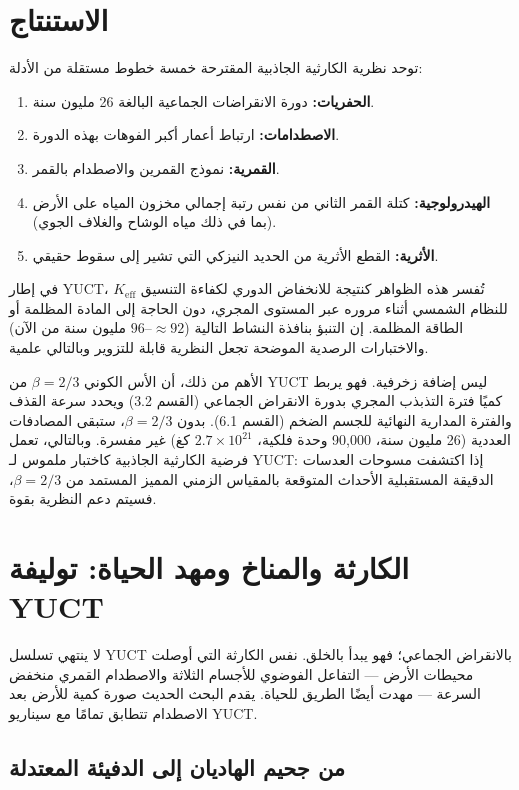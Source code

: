 \documentclass[11pt,a4paper]{article}
\begin{document}
	\section{الاستنتاج}
	
	توحد نظرية الكارثية الجاذبية المقترحة خمسة خطوط مستقلة من الأدلة:
	\begin{enumerate}
		\item \textbf{الحفريات:} دورة الانقراضات الجماعية البالغة 26 مليون سنة.
		\item \textbf{الاصطدامات:} ارتباط أعمار أكبر الفوهات بهذه الدورة.
		\item \textbf{القمرية:} نموذج القمرين والاصطدام بالقمر.
		\item \textbf{الهيدرولوجية:} كتلة القمر الثاني من نفس رتبة إجمالي مخزون المياه على الأرض (بما في ذلك مياه الوشاح والغلاف الجوي).
		\item \textbf{الأثرية:} القطع الأثرية من الحديد النيزكي التي تشير إلى سقوط حقيقي.
	\end{enumerate}
	في إطار YUCT، تُفسر هذه الظواهر كنتيجة للانخفاض الدوري لكفاءة التنسيق \(K_{\mathrm{eff}}\) للنظام الشمسي أثناء مروره عبر المستوى المجري، دون الحاجة إلى المادة المظلمة أو الطاقة المظلمة. إن التنبؤ بنافذة النشاط التالية (\(\approx 92\)–\(96\) مليون سنة من الآن) والاختبارات الرصدية الموضحة تجعل النظرية قابلة للتزوير وبالتالي علمية.
	
	الأهم من ذلك، أن الأس الكوني $\beta = 2/3$ من YUCT ليس إضافة زخرفية. فهو يربط كميًا فترة التذبذب المجري بدورة الانقراض الجماعي (القسم 3.2) ويحدد سرعة القذف والفترة المدارية النهائية للجسم الضخم (القسم 6.1). بدون $\beta = 2/3$، ستبقى المصادفات العددية (26 مليون سنة، 90,000 وحدة فلكية، \(2.7\times10^{21}\) كغ) غير مفسرة. وبالتالي، تعمل فرضية الكارثية الجاذبية كاختبار ملموس لـ YUCT: إذا اكتشفت مسوحات العدسات الدقيقة المستقبلية الأحداث المتوقعة بالمقياس الزمني المميز المستمد من $\beta = 2/3$، فسيتم دعم النظرية بقوة.
	
	\section{الكارثة والمناخ ومهد الحياة: توليفة YUCT}
	
	لا ينتهي تسلسل YUCT بالانقراض الجماعي؛ فهو يبدأ بالخلق. 
	نفس الكارثة التي أوصلت محيطات الأرض — التفاعل الفوضوي للأجسام الثلاثة والاصطدام القمري منخفض السرعة — مهدت أيضًا الطريق للحياة. 
	يقدم البحث الحديث صورة كمية للأرض بعد الاصطدام تتطابق تمامًا مع سيناريو YUCT.
	
	\subsection{من جحيم الهاديان إلى الدفيئة المعتدلة}
	
\end{document}

